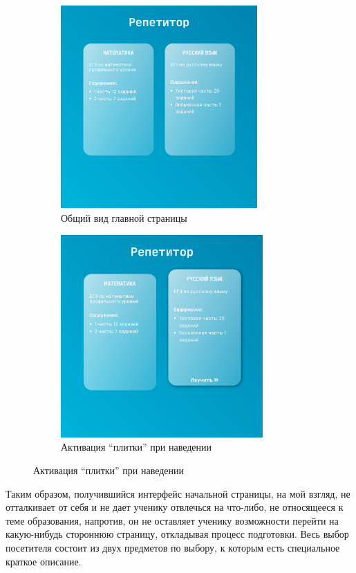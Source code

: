 \documentclass[a4paper, 12pt]{extarticle}
\begin{document}
\begin{figure}[h]
    \begin{subfigure}{.5\textwidth}
        \centering
        \includegraphics[height=220pt]{./img/tiles.png}
        \caption{Общий вид главной страницы}
    \end{subfigure}
    \begin{subfigure}{.5\textwidth}
        \centering
        \includegraphics[height=220pt]{./img/tileHover.png}
        \caption{Активация \enquote{плитки} при наведении}
    \end{subfigure}
\end{figure}

Таким образом, получившийся интерфейс начальной страницы, на мой взгляд, не
отталкивает от себя и не дает ученику отвлечься на что-либо, не относящееся к
теме образования, напротив, он не оставляет ученику возможности перейти на
какую-нибудь стороннюю страницу, откладывая процесс подготовки. Весь выбор
посетителя состоит из двух предметов по выбору, к которым есть специальное
краткое описание.
\newpage
\end{document}
